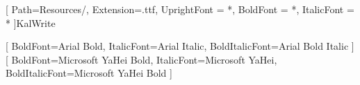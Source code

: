 \usepackage{fontenc}
\usepackage{fontspec}
\usepackage{lipsum}
\usepackage{ctex}
\usepackage{graphicx}
\usepackage{fancyhdr}
\usepackage{hyperref}
\usepackage{amsmath, amsthm, amssymb}
\usepackage{etoolbox}
\usepackage{marginfix}
\usepackage{framed}
\usepackage[dvipsnames]{xcolor}
\usepackage{titlesec}
\usepackage{ragged2e}
\usepackage{multicol}
\usepackage[most]{tcolorbox}
\usepackage{titletoc}
\usepackage{wallpaper}
\usepackage{tikz}
\usepackage{etoolbox}
\usepackage[normalem]{ulem}

\usetikzlibrary{positioning}
\usetikzlibrary{decorations.pathmorphing}
\usetikzlibrary{calc}


\usepackage[
    paper=a4paper,
    top=2cm,
    bottom=2cm,
    left=1.5cm,           
    right=6cm,          %
    marginparwidth=4.5cm, 
    marginparsep=0.5cm, 
    headheight=16pt,    %
    asymmetric          %
]{geometry}


\newfontfamily{}
[
    Path=Resources/,
    Extension=.ttf,
    UprightFont = *,
    BoldFont = *,
    ItalicFont = *
]{KalWrite}
\newcommand{\KalWrite}{\CJKfamily{kalwrite}\kalwrite}
\newcommand{\Kal}[1]{{\color{commentcolor} \KalWrite #1}}

[
    BoldFont=Arial Bold,
    ItalicFont=Arial Italic,
    BoldItalicFont=Arial Bold Italic
]
[
    BoldFont=Microsoft YaHei Bold,
    ItalicFont=Microsoft YaHei,
    BoldItalicFont=Microsoft YaHei Bold
]
\newcommand{\headfont}{\arial\CJKfamily{hei}}



\renewcommand{\chaptermark}[1]{
    \markboth{\thechapter\quad #1}{}}

\renewcommand{\sectionmark}[1]{
    \markright{\thesection\quad #1}}


\pagestyle{fancy}
\fancyhf{}

\fancyhfoffset[R]{5.7cm}
\fancyhead[C]{\small \headfont ■ \mybooktitle \hspace{10cm} ■ \mybooksubtitle}


\newcommand{\VerticalContent}{
    \rotatebox{-90}{\small {\headfont ■ \heiti \textbf{\thepage}} \hspace{16cm} \leftmark / \rightmark}
}

